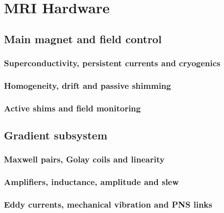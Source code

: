 \chapter{MRI Hardware}
\label{ch:17}

\section{Main magnet and field control}
\label{sec:17:main-magnet-and-field-control}
\subsection{Superconductivity, persistent currents and cryogenics}
\subsection{Homogeneity, drift and passive shimming}
\subsection{Active shims and field monitoring}

\section{Gradient subsystem}
\label{sec:17:gradient-subsystem}
\subsection{Maxwell pairs, Golay coils and linearity}
\subsection{Amplifiers, inductance, amplitude and slew}
\subsection{Eddy currents, mechanical vibration and PNS links}

